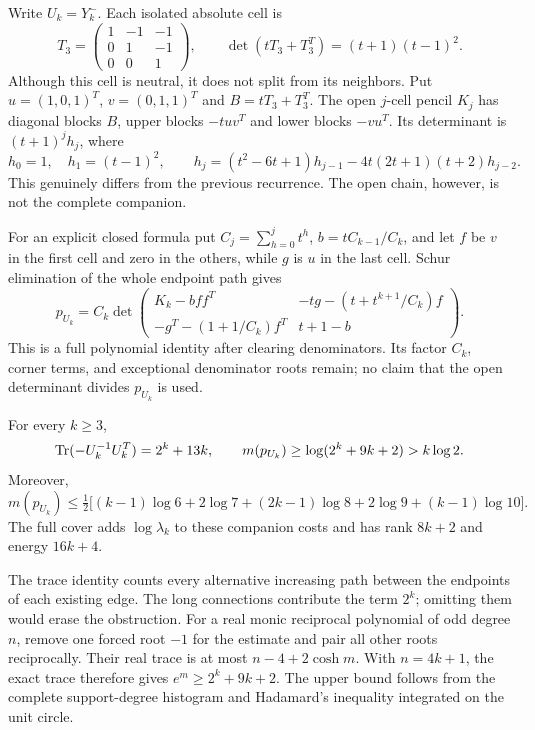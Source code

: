 Write $U_k=Y_k^-$.
Each isolated absolute cell is
\[
 T_3=\begin{pmatrix}1&-1&-1\\0&1&-1\\0&0&1\end{pmatrix},
 \qquad\det(tT_3+T_3^T)=(t+1)(t-1)^2.
\]
Although this cell is neutral, it does not split from its neighbors.
Put $u=(1,0,1)^T$, $v=(0,1,1)^T$ and $B=tT_3+T_3^T$.
The open $j$-cell pencil $K_j$ has diagonal blocks $B$, upper blocks $-tuv^T$ and lower blocks $-vu^T$.
Its determinant is $(t+1)^jh_j$, where
\begin{equation}\label{str:changed-recurrence}
 h_0=1,\quad h_1=(t-1)^2,\qquad
 h_j=(t^2-6t+1)h_{j-1}
       -4t(2t+1)(t+2)h_{j-2}.
\end{equation}
This genuinely differs from the previous recurrence.
The open chain, however, is not the complete companion.

For an explicit closed formula put $C_j=\sum_{h=0}^jt^h$, $b=tC_{k-1}/C_k$, and let $f$ be $v$ in the first cell and zero in the others, while $g$ is $u$ in the last cell.
Schur elimination of the whole endpoint path \cite[Appendix~A.5.5]{BV04} gives
\begin{equation}\label{str:closed}
 p_{U_k}=C_k\det
 \begin{pmatrix}
 K_k-bff^T&-tg-(t+t^{k+1}/C_k)f\\
 -g^T-(1+1/C_k)f^T&t+1-b
 \end{pmatrix}.
\end{equation}
This is a full polynomial identity after clearing denominators.
Its factor $C_k$, corner terms, and exceptional denominator roots remain; no claim that the open determinant divides $p_{U_k}$ is used.

\begin{proposition}\label{str:changed-cost}
For every $k\geq3$,
\[
 \operatorname{Tr}(-U_k^{-1}U_k^T)=2^k+13k,\qquad
 m(p_{U_k})\geq\log(2^k+9k+2)>k\log2.
\]
Moreover,
\[
 m(p_{U_k})\leq\tfrac12\bigl[(k-1)\log6+2\log7
                   +(2k-1)\log8+2\log9+(k-1)\log10\bigr].
\]
The full cover adds $\log\lambda_k$ to these companion costs and has rank $8k+2$ and energy $16k+4$.
\end{proposition}

The trace identity counts every alternative increasing path between the endpoints of each existing edge.
The long connections contribute the term $2^k$; omitting them would erase the obstruction.
For a real monic reciprocal polynomial of odd degree $n$, remove one forced root $-1$ for the estimate and pair all other roots reciprocally.
Their real trace is at most $n-4+2\cosh m$.
With $n=4k+1$, the exact trace therefore gives $e^m\geq2^k+9k+2$.
The upper bound follows from the complete support-degree histogram and Hadamard's inequality integrated on the unit circle.

